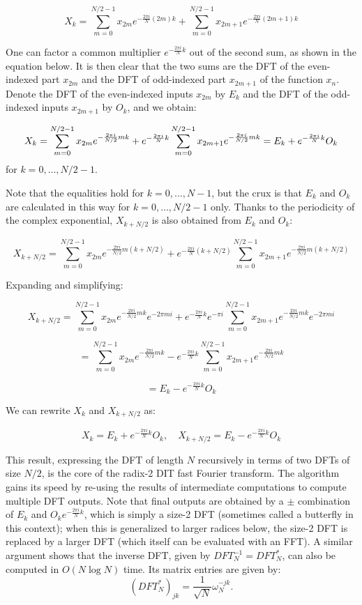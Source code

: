 \[
X_k = \sum_{m=0}^{N/2-1} x_{2m} e^{-\frac{2 \pi i}{N} (2m) k} + \sum_{m=0}^{N/2-1} x_{2m+1} e^{-\frac{2 \pi i}{N} (2m+1) k}
\]

One can factor a common multiplier \( e^{-\frac{2 \pi i}{N} k} \) out of the second sum, as shown in the equation below. It is then clear that the two sums are the DFT of the even-indexed part \( x_{2m} \) and the DFT of odd-indexed part \( x_{2m+1} \) of the function \( x_n \). Denote the DFT of the even-indexed inputs \( x_{2m} \) by \( E_k \) and the DFT of the odd-indexed inputs \( x_{2m+1} \) by \( O_k \), and we obtain:

\[
X_k = \sum_{m=0}^{N/2-1} x_{2m} e^{-\frac{2 \pi i}{N/2} m k} + e^{-\frac{2 \pi i}{N} k} \\
\sum_{m=0}^{N/2-1} x_{2m+1} e^{-\frac{2 \pi i}{N/2} m k} = E_k + e^{-\frac{2 \pi i}{N} k} O_k
\]
for \( k = 0, \dots, N/2-1 \).

Note that the equalities hold for \( k = 0, \dots, N-1 \), but the crux is that \( E_k \) and \( O_k \) are calculated in this way for \( k = 0, \dots, N/2-1 \) only. Thanks to the periodicity of the complex exponential, \( X_{k + N/2} \) is also obtained from \( E_k \) and \( O_k \):

\[
X_{k + N/2} = \sum_{m=0}^{N/2-1} x_{2m} e^{-\frac{2 \pi i}{N/2} m (k + N/2)} + e^{-\frac{2 \pi i}{N} (k + N/2)} \sum_{m=0}^{N/2-1} x_{2m+1} e^{-\frac{2 \pi i}{N/2} m (k + N/2)}
\]

Expanding and simplifying:

\[
X_{k + N/2} = \sum_{m=0}^{N/2-1} x_{2m} e^{-\frac{2 \pi i}{N/2} m k} e^{-2 \pi mi} + e^{-\frac{2 \pi i}{N} k} e^{-\pi i} \sum_{m=0}^{N/2-1} x_{2m+1} e^{-\frac{2 \pi i}{N/2} m k} e^{-2 \pi mi}
\]

\[
= \sum_{m=0}^{N/2-1} x_{2m} e^{-\frac{2 \pi i}{N/2} m k} - e^{-\frac{2 \pi i}{N} k} \sum_{m=0}^{N/2-1} x_{2m+1} e^{-\frac{2 \pi i}{N/2} m k}
\]

\[
= E_k - e^{-\frac{2 \pi i}{N} k} O_k
\]

We can rewrite \( X_k \) and \( X_{k + N/2} \) as:

\[
X_k = E_k + e^{-\frac{2 \pi i}{N} k} O_k, \quad X_{k + N/2} = E_k - e^{-\frac{2 \pi i}{N} k} O_k
\]

This result, expressing the DFT of length \( N \) recursively in terms of two DFTs of size \( N/2 \), is the core of the radix-2 DIT fast Fourier transform. The algorithm gains its speed by re-using the results of intermediate computations to compute multiple DFT outputs. Note that final outputs are obtained by a \( \pm \) combination of \( E_k \) and \( O_k e^{-\frac{2 \pi i}{N} k} \), which is simply a size-2 DFT (sometimes called a butterfly in this context); when this is generalized to larger radices below, the size-2 DFT is replaced by a larger DFT (which itself can be evaluated with an FFT).
A similar argument shows that the inverse DFT, given by $DFT_N^{-1} = DFT_N^*$, can also be computed in $O(N \log N)$ time. Its matrix entries are given by:
\[
(DFT_N^*)_{jk} = \frac{1}{\sqrt{N}} \omega_N^{-jk}.
\]

